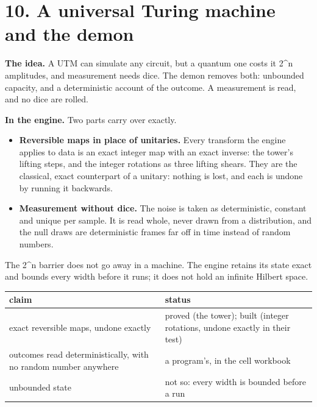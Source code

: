 \section{\texorpdfstring{10. A universal Turing machine and the demon}{10. A universal Turing machine and the demon}}

\textbf{The idea.} A UTM can simulate any circuit, but a quantum one costs it 2\textasciicircum{}n amplitudes, and measurement needs dice. The demon removes both: unbounded capacity, and a deterministic account of the outcome. A measurement is read, and no dice are rolled.

\textbf{In the engine.} Two parts carry over exactly.

\begin{itemize}
\item \textbf{Reversible maps in place of unitaries.} Every transform the engine applies to data is an exact integer map with an exact inverse: the tower's lifting steps, and the integer rotations as three lifting shears. They are the classical, exact counterpart of a unitary: nothing is lost, and each is undone by running it backwards.
\item \textbf{Measurement without dice.} The noise is taken as deterministic, constant and unique per sample. It is read whole, never drawn from a distribution, and the null draws are deterministic frames far off in time instead of random numbers.
\end{itemize}

The 2\textasciicircum{}n barrier does not go away in a machine. The engine retains its state exact and bounds every width before it runs; it does not hold an infinite Hilbert space.

{\small
\setlength{\tabcolsep}{6pt}
\begin{longtable}{>{\RaggedRight\arraybackslash}p{}>{\RaggedRight\arraybackslash}p{}}
\toprule
claim & status \\
\midrule
\endhead
exact reversible maps, undone exactly & proved (the tower); built (integer rotations, undone exactly in their test) \\
outcomes read deterministically, with no random number anywhere & a program's, in the cell workbook \\
unbounded state & not so: every width is bounded before a run \\
\bottomrule
\end{longtable}
}

